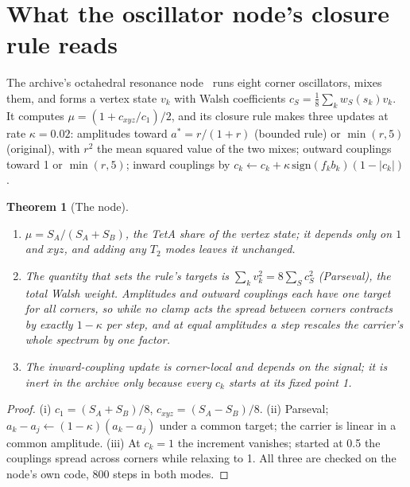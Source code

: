 \documentclass[twocolumn]{iopjournal}
\newtheorem{theorem}{Theorem}
\theoremstyle{definition}
\theoremstyle{remark}
\begin{document}

\section{What the oscillator node's closure rule reads}

The archive's octahedral resonance node~\cite{NelsonPixelated} runs eight
corner oscillators, mixes them, and forms a vertex state $v_k$ with Walsh
coefficients $c_S = \frac18\sum_kw_S(s_k)v_k$. It computes $\mu = (1 +
c_{xyz}/c_1)/2$, and its closure rule makes three updates at rate $\kappa =
0.02$: amplitudes toward $a^* = r/(1+r)$ (bounded rule) or $\min(r, 5)$
(original), with $r^2$ the mean squared value of the two mixes; outward
couplings toward 1 or $\min(r, 5)$; inward couplings by $c_k \leftarrow c_k
+ \kappa\,\mathrm{sign}(f_kb_k)(1 - \lvert c_k\rvert)$.

\begin{theorem}[The node]
\label{thm:node}
\begin{enumerate}
\item[(i)] $\mu = S_A/(S_A + S_B)$, the TetA share of the vertex state; it
  depends only on $1$ and $xyz$, and adding any $T_2$ modes leaves it
  unchanged.
\item[(ii)] The quantity that sets the rule's targets is $\sum_kv_k^2 =
  8\sum_Sc_S^2$ (Parseval), the total Walsh weight. Amplitudes and outward
  couplings each have one target for all corners, so while no clamp acts
  the spread between corners contracts by exactly $1 - \kappa$ per step,
  and at equal amplitudes a step rescales the carrier's whole spectrum by
  one factor.
\item[(iii)] The inward-coupling update is corner-local and depends on the
  signal; it is inert in the archive only because every $c_k$ starts at its
  fixed point 1.
\end{enumerate}
\end{theorem}

\begin{proof}
(i) $c_1 = (S_A + S_B)/8$, $c_{xyz} = (S_A - S_B)/8$. (ii) Parseval; $a_k
- a_j \leftarrow (1 - \kappa)(a_k - a_j)$ under a common target; the
carrier is linear in a common amplitude. (iii) At $c_k = 1$ the increment
vanishes; started at 0.5 the couplings spread across corners while
relaxing to 1. All three are checked on the node's own code, 800 steps in
both modes.
\end{proof}
\end{document}
